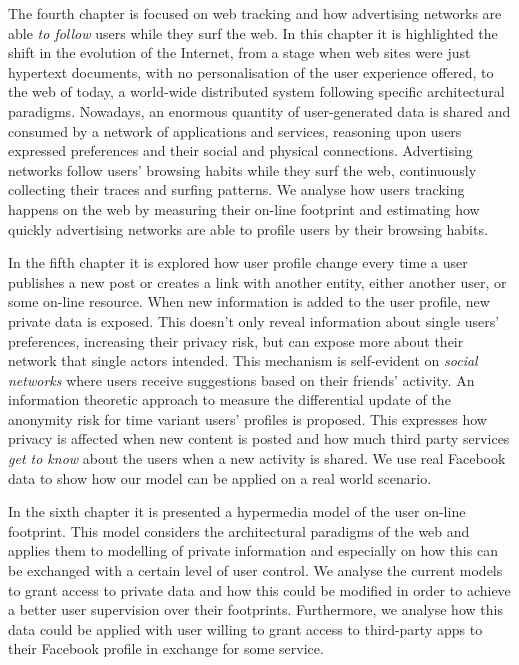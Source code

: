The fourth chapter is focused on web tracking and how advertising networks are able \emph{to follow} users while they surf the web. In this chapter it is highlighted the shift in the evolution of the Internet, from a stage when web sites were just hypertext documents, with no personalisation of the user experience offered, to the web of today, a world-wide distributed system following specific architectural paradigms. Nowadays, an enormous quantity of user-generated data is shared and consumed by a network of applications and services, reasoning upon users expressed preferences and their social and physical connections. Advertising networks follow users’ browsing habits while they surf the web, continuously collecting their traces and surfing patterns. We analyse how users tracking happens on the web by measuring their on-line footprint and estimating how quickly advertising networks are able to profile users by their browsing habits.

In the fifth chapter it is explored how user profile change every time a user publishes a new post or creates a link with another entity, either another user, or some on-line resource. When new information is added to the user profile, new private data is exposed. This doesn't only reveal information about single users' preferences, increasing their privacy risk, but can expose more about their network that single actors intended. This mechanism is self-evident on \emph{social networks} where users receive suggestions based on their friends’ activity. An information theoretic approach to measure the differential update of the anonymity risk for time variant users’ profiles is proposed. This expresses how privacy is affected when new content is posted and how much third party services \emph{get to know} about the users when a new activity is shared. We use real Facebook data to show how our model can be applied on a real world scenario.

In the sixth chapter it is presented a hypermedia model of the user on-line footprint. This model considers the architectural paradigms of the web and applies them to modelling of private information and especially on how this can be exchanged with a certain level of user control. We analyse the current models to grant access to private data and how this could be modified in order to achieve a better user supervision over their footprints. Furthermore, we analyse how this data could be applied with user willing to grant access to third-party apps to their Facebook profile in exchange for some service.

